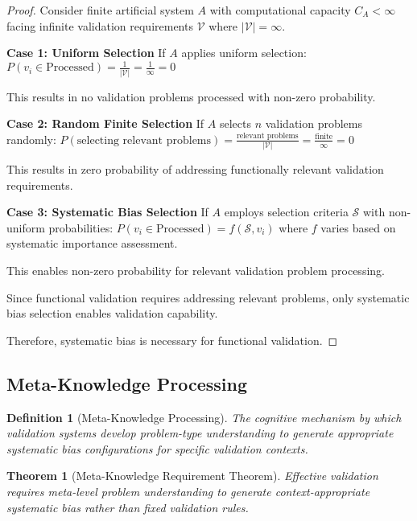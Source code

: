 \documentclass[12pt,a4paper]{article}
\newtheorem{theorem}{Theorem}
\newtheorem{definition}{Definition}
\begin{document}
\begin{proof}
Consider finite artificial system $A$ with computational capacity $C_A < \infty$ facing infinite validation requirements $\mathcal{V}$ where $|\mathcal{V}| = \infty$.

\textbf{Case 1: Uniform Selection}
If $A$ applies uniform selection: $P(v_i \in \text{Processed}) = \frac{1}{|\mathcal{V}|} = \frac{1}{\infty} = 0$

This results in no validation problems processed with non-zero probability.

\textbf{Case 2: Random Finite Selection}
If $A$ selects $n$ validation problems randomly: $P(\text{selecting relevant problems}) = \frac{\text{relevant problems}}{|\mathcal{V}|} = \frac{\text{finite}}{\infty} = 0$

This results in zero probability of addressing functionally relevant validation requirements.

\textbf{Case 3: Systematic Bias Selection}
If $A$ employs selection criteria $\mathcal{S}$ with non-uniform probabilities: $P(v_i \in \text{Processed}) = f(\mathcal{S}, v_i)$ where $f$ varies based on systematic importance assessment.

This enables non-zero probability for relevant validation problem processing.

Since functional validation requires addressing relevant problems, only systematic bias selection enables validation capability.

Therefore, systematic bias is necessary for functional validation.
\end{proof}

\subsection{Meta-Knowledge Processing}

\begin{definition}[Meta-Knowledge Processing]
The cognitive mechanism by which validation systems develop problem-type understanding to generate appropriate systematic bias configurations for specific validation contexts.
\end{definition}

\begin{theorem}[Meta-Knowledge Requirement Theorem]
Effective validation requires meta-level problem understanding to generate context-appropriate systematic bias rather than fixed validation rules.
\end{theorem}
\end{document}
